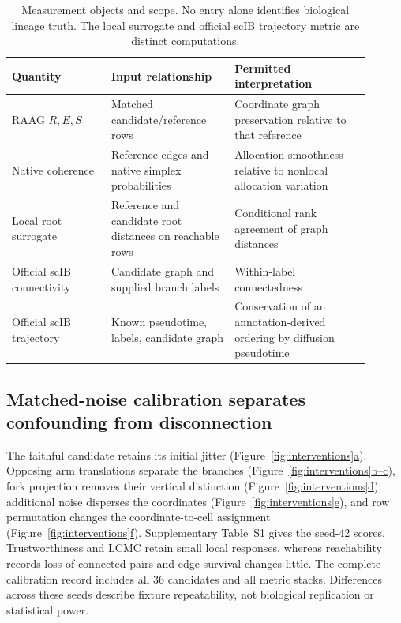 \documentclass[11pt]{article}
\newcommand{\figpanel}[2]{Figure~\hyperref[#1]{\ref*{#1}#2}}
\begin{document}
\begin{table}[tbp]
\centering\small
\caption{Measurement objects and scope. No entry alone identifies biological lineage truth. The local surrogate and official scIB trajectory metric are distinct computations.}
\label{tab:estimands}
\begin{tabular}{>{\raggedright\arraybackslash}p{0.25\linewidth}>{\raggedright\arraybackslash}p{0.31\linewidth}>{\raggedright\arraybackslash}p{0.34\linewidth}}
\toprule
Quantity & Input relationship & Permitted interpretation\\
\midrule
RAAG $R,E,S$ & Matched candidate/reference rows & Coordinate graph preservation relative to that reference\\
Native coherence & Reference edges and native simplex probabilities & Allocation smoothness relative to nonlocal allocation variation\\
Local root surrogate & Reference and candidate root distances on reachable rows & Conditional rank agreement of graph distances\\
Official scIB connectivity & Candidate graph and supplied branch labels & Within-label connectedness\\
Official scIB trajectory & Known pseudotime, labels, candidate graph & Conservation of an annotation-derived ordering by diffusion pseudotime\\
\bottomrule
\end{tabular}
\end{table}





\subsection{Matched-noise calibration separates confounding from disconnection}

The faithful candidate retains its initial jitter (\figpanel{fig:interventions}{a}). Opposing arm translations separate the branches (\figpanel{fig:interventions}{b--c}), fork projection removes their vertical distinction (\figpanel{fig:interventions}{d}), additional noise disperses the coordinates (\figpanel{fig:interventions}{e}), and row permutation changes the coordinate-to-cell assignment (\figpanel{fig:interventions}{f}). Supplementary Table~S1 gives the seed-42 scores. Trustworthiness and LCMC retain small local responses, whereas reachability records loss of connected pairs and edge survival changes little. The complete calibration record includes all 36 candidates and all metric stacks. Differences across these seeds describe fixture repeatability, not biological replication or statistical power.
\end{document}

